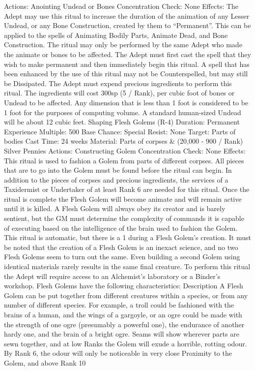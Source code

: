 \documentclass[a4paper]{article}
\begin{document}
\begin{multicols}{3}
Actions: Anointing Undead or Bones
Concentration Check: None
Effects: The Adept may use this ritual to increase
the duration of the animation of any Lesser Undead, or any Bone Construction, created by them to
“Permanent”. This can be applied to the spells of
Animating Bodily Parts, Animate Dead, and Bone
Construction. The ritual may only be performed by
the same Adept who made the animate or bones to
be affected. The Adept must first cast the spell that
they wish to make permanent and then immediately begin this ritual. A spell that has been enhanced by the use of this ritual may not be Counterspelled, but may still be Dissipated. The Adept
must expend precious ingredients to perform this
ritual. The ingredients will cost 300sp (5 / Rank),
per cubic foot of bones or Undead to be affected.
Any dimension that is less than 1 foot is considered
to be 1 foot for the purposes of computing volume.
A standard human-sized Undead will be about 12
cubic feet.
Shaping Flesh Golems (R-4)
Duration: Permanent
Experience Multiple: 500
Base Chance: Special
Resist: None
Target: Parts of bodies
Cast Time: 24 weeks
Material: Parts of corpses & (20,000 - 900 / Rank)
Silver Pennies
Actions: Constructing Golem
Concentration Check: None
Effects: This ritual is used to fashion a Golem from
parts of different corpses. All pieces that are to go
into the Golem must be found before the ritual can
begin. In addition to the pieces of corpses and
precious ingredients, the services of a Taxidermist
or Undertaker of at least Rank 6 are needed for this
ritual. Once the ritual is complete the Flesh Golem
will become animate and will remain active until it
is killed. A Flesh Golem will always obey its creator and is barely sentient, but the GM must determine the complexity of commands it is capable of
executing based on the intelligence of the brain
used to fashion the Golem. This ritual is automatic,
but there is a 1%
during a Flesh Golem’s creation. It must be noted
that the creation of a Flesh Golem is an inexact
science, and no two Flesh Golems seem to turn out
the same. Even building a second Golem using
identical materials rarely results in the same final
creature. To perform this ritual the Adept will
require access to an Alchemist’s laboratory or a
Binder’s workshop. Flesh Golems have the following characteristics:
Description A Flesh Golem can be put together
from different creatures within a species, or from
any number of different species. For example, a
troll could be fashioned with the brains of a human,
and the wings of a gargoyle, or an ogre could be
made with the strength of one ogre (presumably a
powerful one), the endurance of another hardy one,
and the brain of a bright ogre. Seams will show
wherever parts are sewn together, and at low Ranks
the Golem will exude a horrible, rotting odour. By
Rank 6, the odour will only be noticeable in very
close Proximity to the Golem, and above Rank 10


\end{multicols}
\end{document}
